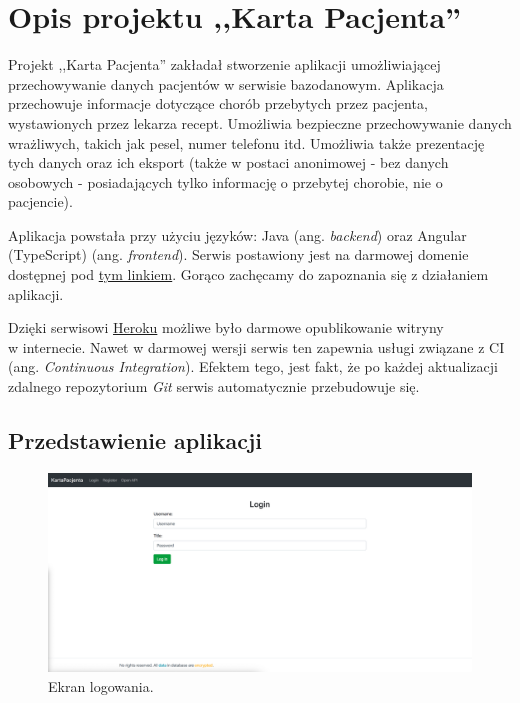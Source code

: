 \section{Opis projektu ,,Karta Pacjenta''}
Projekt ,,Karta Pacjenta'' zakładał stworzenie aplikacji umożliwiającej przechowywanie danych pacjentów w serwisie bazodanowym.
Aplikacja przechowuje informacje dotyczące chorób przebytych przez pacjenta, wystawionych przez lekarza recept.
Umożliwia bezpieczne przechowywanie danych wrażliwych, takich jak pesel, numer telefonu itd.
Umożliwia także prezentację tych danych oraz ich eksport (także w postaci anonimowej - bez danych osobowych -
posiadających tylko informację o przebytej chorobie, nie o pacjencie).

Aplikacja powstała przy użyciu języków: Java (ang. \textit{backend}) oraz Angular (TypeScript) (ang. \textit{frontend}).
Serwis postawiony jest na darmowej domenie dostępnej pod \href{http://trunk-kartapacjenta.herokuapp.com/}{tym linkiem}.
Gorąco zachęcamy do zapoznania się z działaniem aplikacji.

Dzięki serwisowi \href{https://heroku.com/} {Heroku} możliwe było darmowe opublikowanie witryny\\ w internecie.
Nawet w darmowej wersji serwis ten zapewnia usługi związane z CI (ang. \textit{Continuous Integration}).
Efektem tego, jest fakt, że po każdej aktualizacji zdalnego repozytorium \textit{Git} serwis automatycznie przebudowuje się.

\subsection{Przedstawienie aplikacji}

\begin{figure}[H]
\centering
\includegraphics[width=15cm]{pictures/service/01_login}
\caption{Ekran logowania.}
\end{figure}

